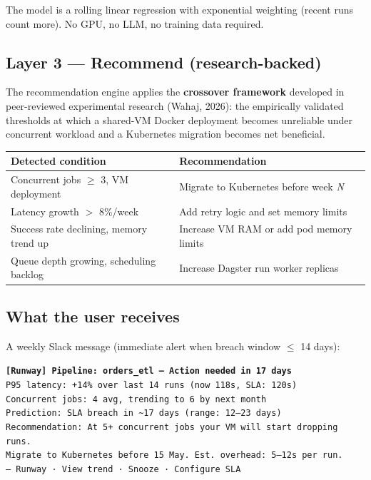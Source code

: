 The model is a rolling linear regression with exponential weighting (recent runs count more).
No GPU, no LLM, no training data required.

\subsection{Layer 3 — Recommend (research-backed)}

The recommendation engine applies the \textbf{crossover framework} developed in peer-reviewed
experimental research (Wahaj, 2026): the empirically validated thresholds at which a
shared-VM Docker deployment becomes unreliable under concurrent workload and a Kubernetes
migration becomes net beneficial.

\begin{center}
\small
\begin{tabular}{l l}
  \toprule
  \textbf{Detected condition} & \textbf{Recommendation} \\
  \midrule
  Concurrent jobs $\geq$ 3, VM deployment     & Migrate to Kubernetes before week \textit{N} \\
  Latency growth $>$ 8\%/week                 & Add retry logic and set memory limits \\
  Success rate declining, memory trend up     & Increase VM RAM or add pod memory limits \\
  Queue depth growing, scheduling backlog     & Increase Dagster run worker replicas \\
  \bottomrule
\end{tabular}
\end{center}

\subsection{What the user receives}

A weekly Slack message (immediate alert when breach window $\leq$ 14 days):

\begin{callout}
\texttt{\textbf{[Runway] Pipeline: orders\_etl — Action needed in 17 days}}\\[4pt]
\texttt{P95 latency: +14\% over last 14 runs (now 118s, SLA: 120s)}\\
\texttt{Concurrent jobs: 4 avg, trending to 6 by next month}\\[4pt]
\texttt{Prediction: SLA breach in \textasciitilde17 days (range: 12–23 days)}\\[4pt]
\texttt{Recommendation: At 5+ concurrent jobs your VM will start dropping runs.}\\
\texttt{Migrate to Kubernetes before 15 May. Est. overhead: 5–12s per run.}\\[4pt]
\texttt{— Runway · View trend · Snooze · Configure SLA}
\end{callout}
